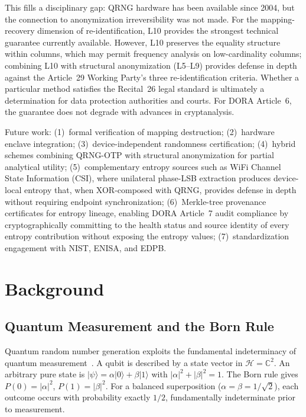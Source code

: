 \documentclass[acmsmall,screen,review,anonymous]{acmart}
\begin{document}
This fills a disciplinary gap: QRNG hardware has been available since 2004, but the connection to anonymization irreversibility was not made. For the mapping-recovery dimension of re-identification, L10 provides the strongest technical guarantee currently available. However, L10 preserves the equality structure within columns, which may permit frequency analysis on low-cardinality columns; combining L10 with structural anonymization (L5--L9) provides defense in depth against the Article~29 Working Party's three re-identification criteria. Whether a particular method satisfies the Recital~26 legal standard is ultimately a determination for data protection authorities and courts. For DORA Article~6, the guarantee does not degrade with advances in cryptanalysis.

Future work: (1)~formal verification of mapping destruction; (2)~hardware enclave integration; (3)~device-independent randomness certification; (4)~hybrid schemes combining QRNG-OTP with structural anonymization for partial analytical utility; (5)~complementary entropy sources such as WiFi Channel State Information (CSI), where unilateral phase-LSB extraction produces device-local entropy that, when XOR-composed with QRNG, provides defense in depth without requiring endpoint synchronization; (6)~Merkle-tree provenance certificates for entropy lineage, enabling DORA Article~7 audit compliance by cryptographically committing to the health status and source identity of every entropy contribution without exposing the entropy values; (7)~standardization engagement with NIST, ENISA, and EDPB.

\appendix

\section{Background}
\label{app:background}

\subsection{Quantum Measurement and the Born Rule}

Quantum random number generation exploits the fundamental indeterminacy of quantum measurement~\cite{ma2016qrng, herrero2017qrng}. A qubit is described by a state vector in $\mathcal{H} = \mathbb{C}^2$. An arbitrary pure state is $|\psi\rangle = \alpha|0\rangle + \beta|1\rangle$ with $|\alpha|^2 + |\beta|^2 = 1$. The Born rule gives $P(0) = |\alpha|^2$, $P(1) = |\beta|^2$. For a balanced superposition ($\alpha = \beta = 1/\sqrt{2}$), each outcome occurs with probability exactly $1/2$, fundamentally indeterminate prior to measurement.
\end{document}
